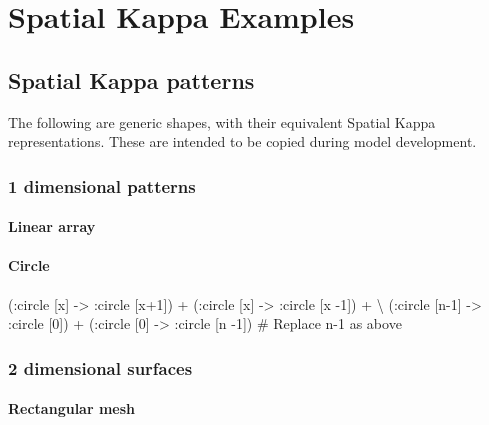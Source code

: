 \chapter{Spatial Kappa Examples}
\label{chap:resources}

\section{Spatial Kappa patterns}
\label{sec:spatialPatterns}

The following are generic shapes, with their equivalent Spatial Kappa representations. These are intended to be copied during model development.


\subsection{1 dimensional patterns}

\subsubsection{Linear array}

\begin{kappasource}
\end{kappasource}

\subsubsection{Circle}

\begin{kappasource}
    (:circle [x] -> :circle [x+1]) + (:circle [x] -> :circle [x -1]) + {\textbackslash}
    (:circle [n-1] -> :circle [0]) + (:circle [0] -> :circle [n -1]) # Replace n-1 as above
\end{kappasource}


\subsection{2 dimensional surfaces}

\subsubsection{Rectangular mesh}

